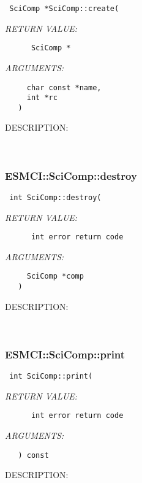   
\begin{verbatim} SciComp *SciComp::create(\end{verbatim}{\em RETURN VALUE:}
\begin{verbatim}      SciComp *\end{verbatim}{\em ARGUMENTS:}
\begin{verbatim}     char const *name,
     int *rc
   )\end{verbatim}
{\sf DESCRIPTION:\\ }


   
 
\mbox{}\hrulefill\
 
\subsubsection [ESMCI::SciComp::destroy] {ESMCI::SciComp::destroy}


  
\begin{verbatim} int SciComp::destroy(\end{verbatim}{\em RETURN VALUE:}
\begin{verbatim}      int error return code\end{verbatim}{\em ARGUMENTS:}
\begin{verbatim}     SciComp *comp
   )\end{verbatim}
{\sf DESCRIPTION:\\ }


   
 
\mbox{}\hrulefill\
 
\subsubsection [ESMCI::SciComp::print] {ESMCI::SciComp::print}


  
\begin{verbatim} int SciComp::print(\end{verbatim}{\em RETURN VALUE:}
\begin{verbatim}      int error return code\end{verbatim}{\em ARGUMENTS:}
\begin{verbatim}   ) const\end{verbatim}
{\sf DESCRIPTION:\\ }


  
\setlength{\parskip}{\oldparskip}
\setlength{\parindent}{\oldparindent}
\setlength{\baselineskip}{\oldbaselineskip}
